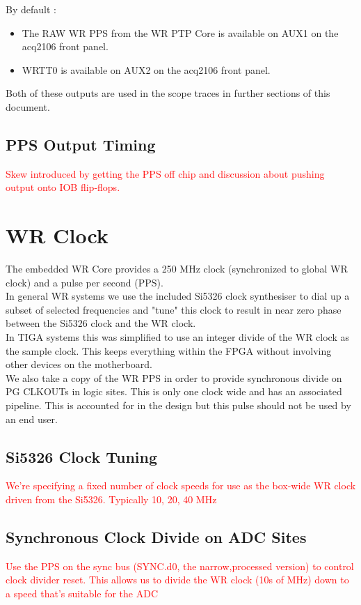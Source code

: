 \documentclass[]{article}
\begin{document}
By default :
\begin{itemize}
	\item The RAW WR PPS from the WR PTP Core is available on AUX1 on the acq2106 front panel.
	\item WRTT0 is available on AUX2 on the acq2106 front panel.
\end{itemize}

Both of these outputs are used in the scope traces in further sections of this document.

\subsection{PPS Output Timing}\label{pps_out_timing}
\textcolor{red}{Skew introduced by getting the PPS off chip and discussion about pushing output onto IOB flip-flops.}

\section{WR Clock}
The embedded WR Core provides a 250 MHz clock (synchronized to global WR clock) and a pulse per second (PPS).\\

In general WR systems we use the included Si5326 clock synthesiser to dial up a subset of selected frequencies and "tune" this clock to result in near zero phase between the Si5326 clock and the WR clock.\\

In TIGA systems this was simplified to use an integer divide of the WR clock as the sample clock. This keeps everything within the FPGA without involving other devices on the motherboard.\\

We also take a copy of the WR PPS in order to provide synchronous divide on PG CLKOUTs in logic sites. This is only one clock wide and has an associated pipeline. This is accounted for in the design but this pulse should not be used by an end user.

\subsection{Si5326 Clock Tuning}
\textcolor{red}{We're specifying a fixed number of clock speeds for use as the box-wide WR clock driven from the Si5326. Typically 10, 20, 40 MHz}

\subsection{Synchronous Clock Divide on ADC Sites}
\textcolor{red}{Use the PPS on the sync bus (SYNC.d0, the narrow,processed version) to control clock divider reset. This allows us to divide the WR clock (10s of MHz) down to a speed that's suitable for the ADC}
\end{document}
